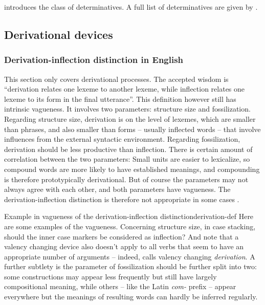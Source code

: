 \documentclass[UTF8, a4paper, oneside, scheme=plain]{ctexrep}
\newcommand*{\citepage}[1]{pp.~{#1}}
\newcommand*{\term}[1]{\emph{#1}}
\newcommand{\corpus}[1]{\emph{#1}}
\begin{document}
\citet[\citepage{330}]{cgel} introduces the class of determinatives.
A full list of determinatives are given by \citet[\citepage{356}]{cgel}.

\subsection{Derivational devices}

\subsubsection{Derivation-inflection distinction in English}

This section only covers derivational processes.
The accepted wisdom is ``derivation relates one lexeme to another lexeme,
while inflection relates one lexeme to its form in the final utterance''.
This definition however still has intrinsic vagueness.
It involves two parameters:
structure size
and fossilization.
Regarding structure size,
derivation is on the level of lexemes,
which are smaller than phrases,
and also smaller than forms -- usually inflected words -- 
that involve influences from the external syntactic environment.
Regarding fossilization, 
derivation should be less productive than inflection.
There is certain amount of correlation between the two parameters:
Small units are easier to lexicalize, 
so compound words are more likely to have established meanings,
and compounding is therefore prototypically derivational.
But of course the parameters may not always agree with each other,
and both parameters have vagueness.
The derivation-inflection distinction is therefore not appropriate 
in some cases \citep[\citepage{221}]{dixon2009basic1}.

\begin{infobox}{Example in vagueness of the derivation-inflection distinction}{derivation-def}
    Here are some examples of the vagueness.
    Concerning structure size, in case stacking, 
    should the inner case markers be considered as inflection?
    And note that a valency changing device also doesn't apply to all verbs that seem to have 
    an appropriate number of arguments --
    indeed, \citet{jacques2021grammar} calls valency changing \term{derivation}.
    A further subtlety is the parameter of fossilization should be further split into two:
    some constructions may appear less frequently but still have largely compositional meaning,
    while others -- like the Latin \corpus{com-} prefix -- 
    appear everywhere but the meanings of resulting words
    can hardly be inferred regularly.
\end{infobox}
\end{document}

